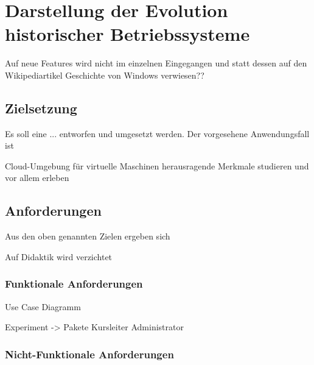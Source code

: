 \chapter{Darstellung der Evolution historischer Betriebssysteme}
\label{chap:challenges}


Auf neue Features wird nicht im einzelnen Eingegangen und statt dessen auf den Wikipediartikel Geschichte von Windows verwiesen??


\section{Zielsetzung}
\label{sec:aims}

		Es soll eine ... entworfen und umgesetzt werden.
		Der vorgesehene Anwendungsfall ist


		Cloud-Umgebung für virtuelle Maschinen
		herausragende Merkmale studieren und vor allem erleben



\section{Anforderungen}
\label{sec:requirements}

		Aus den oben genannten Zielen ergeben sich

		Auf Didaktik wird verzichtet
				
		\subsection{Funktionale Anforderungen}

		Use Case Diagramm

		Experiment -> Pakete
		Kursleiter
		Administrator
				
		\subsection{Nicht-Funktionale Anforderungen}

